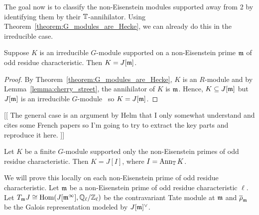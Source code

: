 \documentclass{article}
\begin{document}
The goal now is to classify the non-Eisenstein modules supported away from 2 by
identifying them by their $\mathbb{T}$-annihilator. Using
Theorem~\ref{theorem:G_modules_are_Hecke}, we can already do this in the
irreducible case.
\begin{corollary}
    Suppose $K$ is an irreducible $G$-module supported on a non-Eisenstein
    prime $\mathfrak{m}$ of odd residue characteristic. Then $K=J[\mathfrak{m}]$.
\end{corollary}
\begin{proof}
    By Theorem~\ref{theorem:G_modules_are_Hecke}, $K$ is an $R$-module and by
    Lemma~\ref{lemma:cherry_street}, the annihilator of $K$ is $\mathfrak{m}$. Hence,
    $K\subseteq J[\mathfrak{m}]$ but $J[\mathfrak{m}]$ is an irreducible
    $G$-module~\cite[Proposition 14.2]{mazur:eisenstein} so $K=J[\mathfrak{m}]$.
\end{proof}

[[
The general case is an argument by Helm that I only somewhat understand and
cites some French papers so I'm going to try to extract the key parts and
reproduce it here.
]]

\begin{theorem}\label{theorem:non_eisenstein_kernel_hecke}
    Let $K$ be a finite $G$-module supported only the non-Eisenstein primes of
    odd residue characteristic. Then $K=J[I]$, where $I=\operatorname{Ann}_{\mathbb{T}} K$.
\end{theorem}
We will prove this locally on each non-Eisenstein prime of odd residue
characteristic. Let $\mathfrak{m}$ be a non-Eisenstein prime of odd residue
characteristic $\ell$. Let $T_{\mathfrak{m}} J\cong \operatorname{Hom}(J[\mathfrak{m}^\infty], \mathbb{Q}_\ell/\mathbb{Z}_\ell)$
be the contravariant Tate module at $\mathfrak{m}$ and $\overline{\rho}_{\mathfrak{m}}$ be the Galois
representation modeled by $J[\mathfrak{m}]^\vee$.
\end{document}
